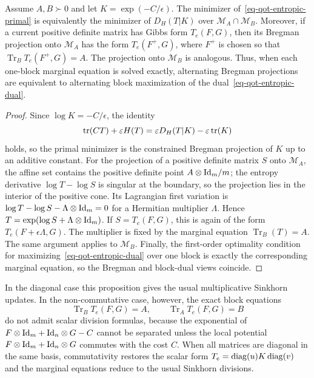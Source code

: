\begin{prop}\label{prop-qot-bregman-projections}
	Assume $A,B\succ0$ and let $K=\exp(-C/\epsilon)$. The minimizer of~\eqref{eq-qot-entropic-primal} is equivalently the minimizer of $D_H(T|K)$ over $\mathcal M_A\cap\mathcal M_B$. Moreover, if a current positive definite matrix has Gibbs form $T_e(F,G)$, then its Bregman projection onto $\mathcal M_A$ has the form $T_e(F^+,G)$, where $F^+$ is chosen so that $\operatorname{Tr}_B T_e(F^+,G)=A$. The projection onto $\mathcal M_B$ is analogous. Thus, when each one-block marginal equation is solved exactly, alternating Bregman projections are equivalent to alternating block maximization of the dual~\eqref{eq-qot-entropic-dual}.
\end{prop}

\begin{proof}
	Since $\log K=-C/\epsilon$, the identity
	\[
		\operatorname{tr}(CT)+\varepsilon H(T)
		=
		\varepsilon D_H(T|K)-\varepsilon\operatorname{tr}(K)
	\]
	holds, so the primal minimizer is the constrained Bregman projection of $K$ up to an additive constant. For the projection of a positive definite matrix $S$ onto $\mathcal M_A$, the affine set contains the positive definite point $A\otimes\mathrm{Id}_m/m$; the entropy derivative $\log T-\log S$ is singular at the boundary, so the projection lies in the interior of the positive cone. Its Lagrangian first variation is
	\(\log T-\log S-\Lambda\otimes\mathrm{Id}_m=0\)
	for a Hermitian multiplier $\Lambda$. Hence $T=\exp(\log S+\Lambda\otimes\mathrm{Id}_m)$. If $S=T_e(F,G)$, this is again of the form $T_e(F+\epsilon\Lambda,G)$. The multiplier is fixed by the marginal equation $\operatorname{Tr}_B(T)=A$. The same argument applies to $\mathcal M_B$. Finally, the first-order optimality condition for maximizing~\eqref{eq-qot-entropic-dual} over one block is exactly the corresponding marginal equation, so the Bregman and block-dual views coincide.
\end{proof}

In the diagonal case this proposition gives the usual multiplicative Sinkhorn updates. In the non-commutative case, however, the exact block equations
\[
	\operatorname{Tr}_B T_e(F,G)=A,
	\qquad
	\operatorname{Tr}_A T_e(F,G)=B
\]
do not admit scalar division formulas, because the exponential of $F\otimes\mathrm{Id}_m+\mathrm{Id}_n\otimes G-C$ cannot be separated unless the local potential $F\otimes\mathrm{Id}_m+\mathrm{Id}_n\otimes G$ commutes with the cost $C$.
When all matrices are diagonal in the same basis, commutativity restores the scalar form $T_e=\operatorname{diag}(u)K\operatorname{diag}(v)$ and the marginal equations reduce to the usual Sinkhorn divisions.

